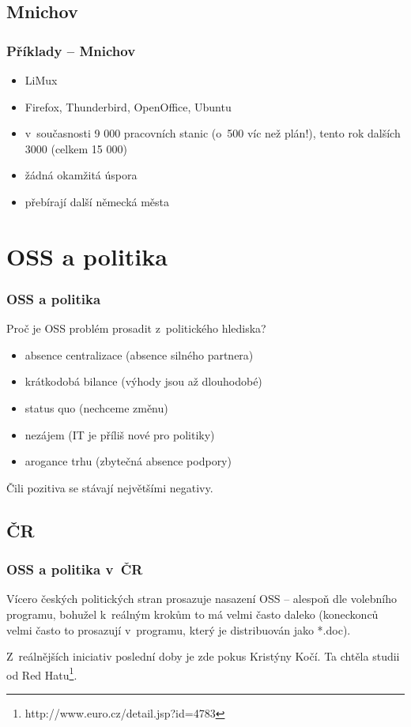 \documentclass[12pt]{beamer}
\begin{document}
\subsection{Mnichov}
\begin{frame}
 \frametitle{Příklady -- Mnichov}
 \begin{itemize}
  \item LiMux
  \item Firefox, Thunderbird, OpenOffice, Ubuntu
  \item v~současnosti 9 000 pracovních stanic (o~500 víc než plán!), tento rok dalších 3000 (celkem 15 000)
  \item žádná okamžitá úspora 
  \item přebírají další německá města
 \end{itemize}
\end{frame}

\section{OSS a politika}
\begin{frame}
 \frametitle{OSS a politika}
 Proč je OSS problém prosadit z~politického hlediska?
 \begin{itemize}
  \item absence centralizace (absence silného partnera)
  \item krátkodobá bilance (výhody jsou až dlouhodobé)
  \item status quo (nechceme změnu)
  \item nezájem (IT je příliš nové pro politiky)  
  \item arogance trhu (zbytečná absence podpory)
 \end{itemize}
 Čili pozitiva se stávají největšími negativy.
\end{frame}

\subsection{ČR}
\begin{frame}
 \frametitle{OSS a politika v~ČR}
Vícero českých politických stran prosazuje nasazení OSS -- alespoň dle volebního programu, bohužel k~reálným krokům to má velmi často daleko (koneckonců velmi často to prosazují v~programu, který je distribuován jako *.doc).

\bigskip

Z~reálnějších iniciativ poslední doby je zde pokus Kristýny Kočí. Ta chtěla studii od Red Hatu\footnote{http://www.euro.cz/detail.jsp?id=4783}. 
\end{frame}
\end{document}

